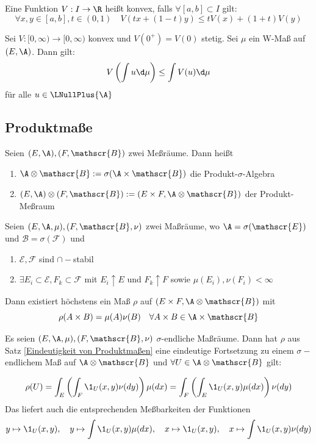 \documentclass[11pt, a4paper]{article}
\def\SigAlg{$\sigma$-Algebra }
\begin{document}
\begin{definition}
    Eine Funktion $V:I\to \R$ heißt konvex, falls $\forall [a,b]\subset I$ gilt:
    $$\forall x,y\in [a,b], t\in (0,1)\quad V(tx +(1-t)y) \leqslant tV(x) + (1+t)V(y)$$
\end{definition}

\begin{theorem}
Sei $V:[0,\infty)\to [0,\infty)$ konvex und $V(0^+) = V(0)$ stetig. Sei $\mu$ ein W-Maß auf $(E,\A)$. Dann gilt:
$$V\left(\int u \d\mu\right) \leq \int V(u) \d\mu$$
für alle $u\in \LNullPlus{\A}$
\end{theorem}


\subsection{Produktmaße}

\begin{definition}
    Seien $(E,\A), (F,\mathscr{B})$ zwei Meßräume. Dann heißt
    \begin{enumerate}
        \item $\A \otimes \mathscr{B}:= \sigma(\A\times \mathscr{B})$ die Produkt-\SigAlg
        \item $(E,\A)\otimes(F,\mathscr{B}):= (E\times F, \A \otimes \mathscr{B})$ der Produkt-Meßraum
    \end{enumerate}
\end{definition}

\begin{theorem}
Seien $(E,\A, \mu), (F,\mathscr{B},\nu)$ zwei Maßräume, wo $\A = \sigma(\mathscr{E})$ und $\mathscr{B}= \sigma(\mathscr{F})$ und
\begin{enumerate}[label=\roman*)]
    \item $\mathscr{E},\mathscr{F}$ sind $\cap-$stabil
    \item $\exists E_i \subset \mathscr{E}, F_k \subset \mathscr{F}$ mit $E_i \uparrow E$ und $F_k \uparrow F$ sowie $\mu(E_i),\nu(F_i)<\infty$
\end{enumerate}
Dann existiert höchstens ein Maß $\rho$ auf $(E\times F, \A \otimes \mathscr{B})$ mit 
$$\rho(A\times B) = \mu(A)\nu(B) \quad \forall A\times B \in \A\times \mathscr{B}$$

\end{theorem}

\begin{theorem} 
Es seien $(E,\A, \mu), (F,\mathscr{B},\nu)$ $\sigma$-endliche Maßräume. Dann hat $\rho$ aus Satz \ref{Eindeutigkeit von Produktmaßen} eine eindeutige Fortsetzung zu einem $\sigma-$endlichem Maß auf $\A \otimes \mathscr{B}$ und $\forall U\in \A \otimes \mathscr{B}$ gilt:

$$\rho(U) = \int_E \left(\int_F \1_U (x,y) \nu(dy)\right)\mu(dx) = \int_F\left(\int_E \1_U (x,y) \mu(dx)\right)\nu(dy) $$
Das liefert auch die entsprechenden Meßbarkeiten der Funktionen
$$y\mapsto \1_U (x,y), \quad y\mapsto \int \1_U (x,y)\mu(dx), \quad x\mapsto \1_U (x,y), \quad x\mapsto \int \1_U (x,y) \nu(dy)  $$
\end{theorem}
\end{document}
